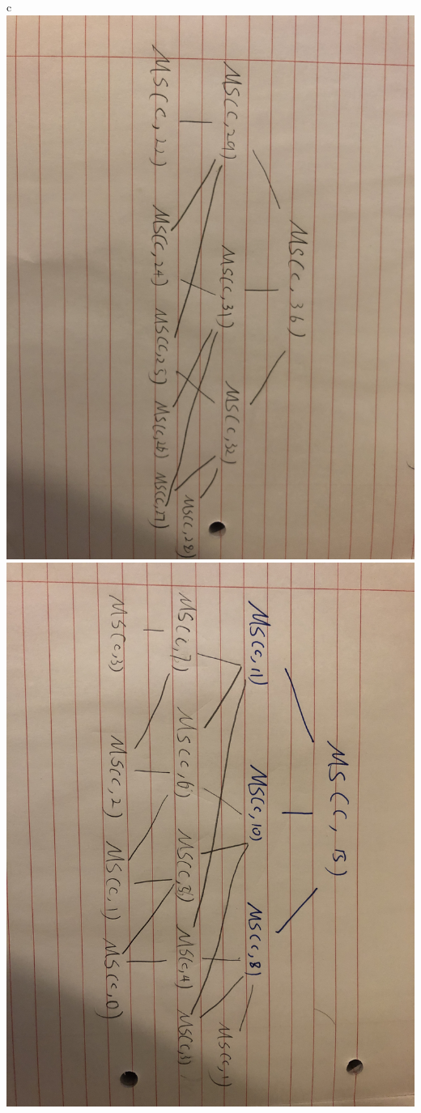 \documentclass[12pt]{article}
\begin{document}
c\\
\includegraphics[scale = 0.1]{3.jpg}
\includegraphics[scale = 0.1]{4.jpg}
\end{document}
